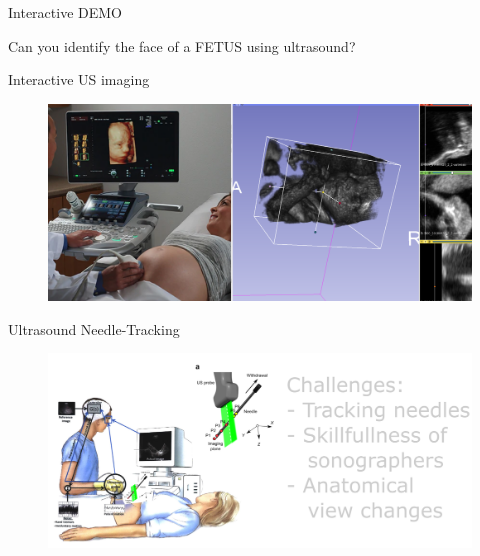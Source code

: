 {
\begin{frame}{Interactive DEMO}

\BigSizeFont
Can you identify the face of a FETUS using ultrasound?

\end{frame}
}

{


\begin{frame}{Interactive US imaging}
      \begin{figure}
        \centering
        \includegraphics[width=1.0\textwidth]{./figures/3dslicer/versions/drawing-v01.png}
      \end{figure}
\end{frame}
}




{
\begin{frame}{Ultrasound Needle-Tracking}
      \begin{figure}
        \centering
        \includegraphics[width=1.0\textwidth]{./figures/sonographer-probe-patient/versions/drawing-v02.png}
      \end{figure}
\end{frame}
}







